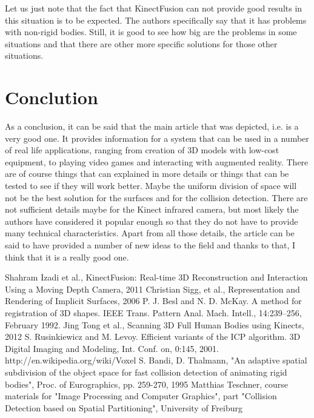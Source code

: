 \documentclass[11pt, a4paper]{article}
\theoremstyle{plain}
\begin{document}
  Let us just note that the fact that KinectFusion can not provide good results
  in this situation is to be expected. The authors specifically say that it has
  problems with non-rigid bodies. Still, it is good to see how big are the
  problems in some situations and that there are other more specific solutions
  for those other situations.

\section{Conclution} %
\label{sec:Conclution}
  As a conclusion, it can be said that the main article that was depicted, i.e.
  \cite{kinectfusion} is a very good one. It provides information for a system
  that can be used in a number of real life applications, ranging from creation
  of 3D models with low-cost equipment, to playing video games and interacting
  with augmented reality. There are of course things that can explained in more
  details or things that can be tested to see if they will work better. Maybe
  the uniform division of space will not be the best solution for the surfaces
  and for the collision detection. There are not sufficient details maybe for
  the Kinect infrared camera, but most likely the authors have considered it
  popular enough so that they do not have to provide many technical
  characteristics. 
  Apart from all those details, the article can be said to have provided a
  number of new ideas to the field and thanks to that, I think that it is a
  really good one.

\begin{thebibliography}{widest entry}
   Shahram Izadi et al., KinectFusion: Real-time 3D
    Reconstruction and Interaction Using a Moving Depth Camera, 2011
   Christian Sigg, et
    al., Representation and Rendering of Implicit Surfaces, 2006
   P. J. Besl and N. D. McKay. A method for registration of 3D
    shapes. IEEE Trans. Pattern Anal. Mach. Intell., 14:239–256, February 1992. 
   Jing Tong et al., Scanning 3D Full Human Bodies using
    Kinects, 2012
   S. Rusinkiewicz and M. Levoy. Efficient variants of the
    ICP algorithm. 3D Digital Imaging and Modeling, Int.
    Conf. on, 0:145, 2001.
   http://en.wikipedia.org/wiki/Voxel
   S. Bandi, D. Thalmann, "An adaptive spatial
    subdivision of the object space for fast collision detection of animating
    rigid bodies", Proc. of Eurographics, pp. 259-270, 1995
   Matthias Teschner, course
    materials for "Image Processing and Computer Graphics", part "Collision
    Detection based on Spatial Partitioning", University of Freiburg 
\end{thebibliography}

\end{document}
